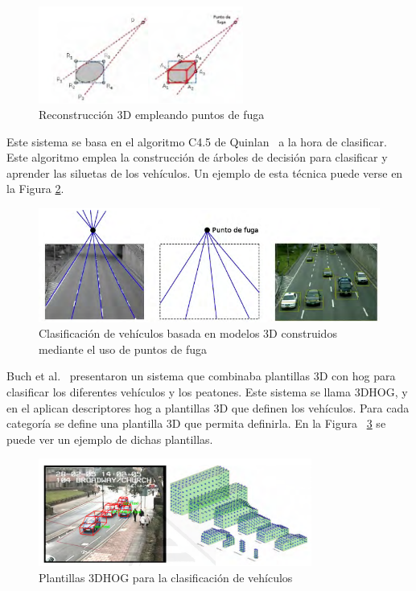 \begin{figure}[H]
  \begin{center}
    \includegraphics[width=0.6\textwidth]{figures/Estado_arte/3d_puntos_fuga.png}
		\caption{Reconstrucción 3D empleando puntos de fuga}
		\label{fig.3d_fuga}
		\end{center}
\end{figure}

Este sistema se basa en el algoritmo C4.5 de Quinlan~\cite{c4_5} a la hora de clasificar. Este algoritmo emplea la construcción de árboles de decisión para clasificar y aprender las siluetas de los vehículos. Un ejemplo de esta técnica puede verse en la Figura \ref{fig.c4_5}.

\begin{figure}[H]
  \begin{center}
    \includegraphics[width=1\textwidth]{figures/Estado_arte/c4_5.png}
		\caption{Clasificación de vehículos basada en modelos 3D construidos mediante el uso de puntos de fuga}
		\label{fig.c4_5}
		\end{center}
\end{figure}

Buch et al.~\cite{3dhog_article} presentaron un sistema que combinaba plantillas 3D con \acrshort{hog} para clasificar los diferentes vehículos y los peatones. Este sistema se llama 3DHOG, y en el aplican descriptores \acrshort{hog} a plantillas 3D que definen los vehículos. Para cada categoría se define una plantilla 3D que permita definirla. En la Figura ~\ref{fig.3dhog} se puede ver un ejemplo de dichas plantillas.

\begin{figure}[H]
  \begin{center}
    \includegraphics[width=0.8\textwidth]{figures/Estado_arte/3dhog.png}
		\caption{Plantillas 3DHOG para la clasificación de vehículos}
		\label{fig.3dhog}
		\end{center}
\end{figure}

